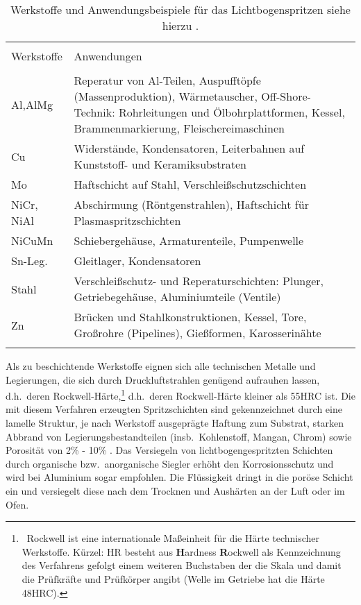 \documentclass[12pt,a4paper,bibliography=totocnumbered,listof=totocnumbered,fleqn]{scrartcl}
\begin{document}
\begin{table}[h]
\centering
\begin{tabular}{p{3cm} p{11cm}}
\hline
\\
Werkstoffe		&	Anwendungen
\\
\hline
\\
Al,AlMg	&	Reperatur von Al-Teilen, Auspufftöpfe (Massenproduktion), Wärmetauscher, Off-Shore-Technik: Rohrleitungen und Ölbohrplattformen, Kessel, Brammenmarkierung, Fleischereimaschinen\\
Cu			&	Widerstände, Kondensatoren, Leiterbahnen auf Kunststoff- und Keramiksubstraten\\
Mo			&	Haftschicht auf Stahl, Verschleißschutzschichten\\
NiCr, NiAl	&	Abschirmung (Röntgenstrahlen), Haftschicht für Plasmaspritzschichten\\
NiCuMn		&	Schiebergehäuse, Armaturenteile, Pumpenwelle\\
Sn-Leg.		&	Gleitlager, Kondensatoren\\
Stahl		&	Verschleißschutz- und Reperaturschichten: Plunger, Getriebegehäuse, Aluminiumteile (Ventile)\\
Zn			&	Brücken und Stahlkonstruktionen, Kessel, Tore, Großrohre (Pipelines), Gießformen, Karosserinähte\\
\\
\hline
\end{tabular}
\caption{Werkstoffe und Anwendungsbeispiele für das Lichtbogenspritzen siehe hierzu \citep{bach2005moderne}.}
\end{table}

Als zu beschichtende Werkstoffe eignen sich alle technischen Metalle und Legierungen, die sich durch Druckluftstrahlen genügend aufrauhen lassen, d.h.\ deren Rockwell-Härte,\footnote{~Rockwell ist eine internationale Maßeinheit für die Härte technischer Werkstoffe. Kürzel: HR besteht aus \textbf{H}ardness \textbf{R}ockwell als Kennzeichnung des Verfahrens gefolgt einem weiteren Buchstaben der die Skala und damit die Prüfkräfte und Prüfkörper angibt (Welle im Getriebe hat die Härte 48HRC).} d.h.\ deren Rockwell-Härte kleiner als 55HRC ist.
Die mit diesem Verfahren erzeugten Spritzschichten sind gekennzeichnet durch eine lamelle Struktur, je nach Werkstoff ausgeprägte Haftung zum Substrat, starken Abbrand von Legierungsbestandteilen (insb.\ Kohlenstoff, Mangan, Chrom) sowie Porosität von 2\% - 10\% .
Das Versiegeln von lichtbogengespritzten Schichten durch organische bzw.\ anorganische Siegler erhöht den Korrosionsschutz und wird bei Aluminium sogar empfohlen.
Die Flüssigkeit dringt in die poröse Schicht ein und versiegelt diese nach dem Trocknen und Aushärten an der Luft oder im Ofen.
\end{document}
